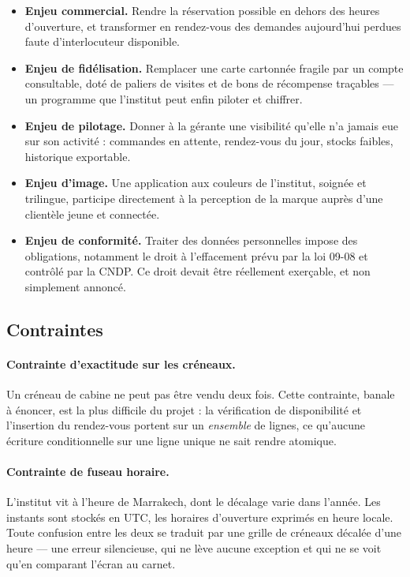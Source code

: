 \begin{itemize}[leftmargin=1.2cm]
  \item \textbf{Enjeu commercial.} Rendre la réservation possible en dehors des
  heures d'ouverture, et transformer en rendez-vous des demandes aujourd'hui
  perdues faute d'interlocuteur disponible.

  \item \textbf{Enjeu de fidélisation.} Remplacer une carte cartonnée fragile
  par un compte consultable, doté de paliers de visites et de bons de
  récompense traçables --- un programme que l'institut peut enfin piloter et
  chiffrer.

  \item \textbf{Enjeu de pilotage.} Donner à la gérante une visibilité qu'elle
  n'a jamais eue sur son activité : commandes en attente, rendez-vous du jour,
  stocks faibles, historique exportable.

  \item \textbf{Enjeu d'image.} Une application aux couleurs de l'institut,
  soignée et trilingue, participe directement à la perception de la marque
  auprès d'une clientèle jeune et connectée.

  \item \textbf{Enjeu de conformité.} Traiter des données personnelles impose
  des obligations, notamment le droit à l'effacement prévu par la loi 09-08 et
  contrôlé par la CNDP. Ce droit devait être réellement exerçable, et non
  simplement annoncé.
\end{itemize}

\subsection{Contraintes}

\paragraph{Contrainte d'exactitude sur les créneaux.} Un créneau de cabine ne
peut pas être vendu deux fois. Cette contrainte, banale à énoncer, est la plus
difficile du projet : la vérification de disponibilité et l'insertion du
rendez-vous portent sur un \emph{ensemble} de lignes, ce qu'aucune écriture
conditionnelle sur une ligne unique ne sait rendre atomique.

\paragraph{Contrainte de fuseau horaire.} L'institut vit à l'heure de
Marrakech, dont le décalage varie dans l'année. Les instants sont stockés en
UTC, les horaires d'ouverture exprimés en heure locale. Toute confusion entre
les deux se traduit par une grille de créneaux décalée d'une heure --- une
erreur silencieuse, qui ne lève aucune exception et qui ne se voit qu'en
comparant l'écran au carnet.

